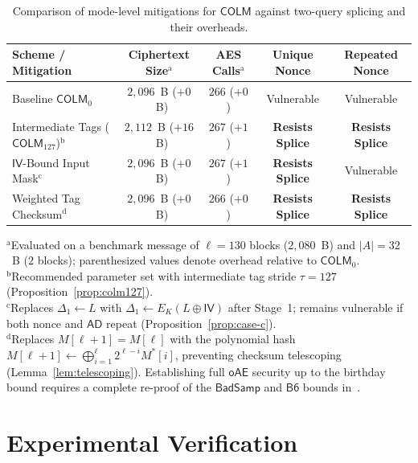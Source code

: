 \documentclass[11pt,a4paper]{article}
\theoremstyle{definition}
\theoremstyle{remark}
\newcommand{\COLM}{\mathsf{COLM}}
\newcommand{\COLMzero}{\mathsf{COLM}_0}
\newcommand{\COLMott}{\mathsf{COLM}_{127}}
\newcommand{\IV}{\mathsf{IV}}
\newcommand{\AD}{\mathsf{AD}}
\begin{document}
\begin{table}[t]
\centering
\caption{Comparison of mode-level mitigations for $\COLM$ against two-query splicing and their overheads.}
\label{tab:mitigations}
\small
\setlength{\tabcolsep}{0pt}
\begin{tabular*}{\textwidth}{@{\extracolsep{\fill}}lcccc@{}}
\toprule
\textbf{Scheme / Mitigation} & \textbf{Ciphertext Size}$^{\mathrm{a}}$ & \textbf{AES Calls}$^{\mathrm{a}}$ & \textbf{Unique Nonce} & \textbf{Repeated Nonce} \\
\midrule
Baseline $\COLMzero$ & $2{,}096$~B ($+0$~B) & $266$ ($+0$) & Vulnerable & Vulnerable \\
Intermediate Tags ($\COLMott$)$^{\mathrm{b}}$ & $2{,}112$~B ($+16$~B) & $267$ ($+1$) & \textbf{Resists Splice} & \textbf{Resists Splice} \\
$\IV$-Bound Input Mask$^{\mathrm{c}}$ & $2{,}096$~B ($+0$~B) & $267$ ($+1$) & \textbf{Resists Splice} & Vulnerable \\
Weighted Tag Checksum$^{\mathrm{d}}$ & $2{,}096$~B ($+0$~B) & $266$ ($+0$) & \textbf{Resists Splice} & \textbf{Resists Splice} \\
\bottomrule
\end{tabular*}
\vspace{3pt}
\parbox{\textwidth}{\footnotesize
$^{\mathrm{a}}$Evaluated on a benchmark message of $\ell = 130$ blocks ($2{,}080$~B) and $|A| = 32$~B ($2$ blocks); parenthesized values denote overhead relative to $\COLMzero$.\\
$^{\mathrm{b}}$Recommended parameter set with intermediate tag stride $\tau = 127$ (Proposition~\ref{prop:colm127}).\\
$^{\mathrm{c}}$Replaces $\Delta_1 \leftarrow L$ with $\Delta_1 \leftarrow E_K(L \oplus \IV)$ after Stage~1; remains vulnerable if both nonce and $\AD$ repeat (Proposition~\ref{prop:case-c}).\\
$^{\mathrm{d}}$Replaces $M[\ell+1] = M[\ell]$ with the polynomial hash $M[\ell+1] \leftarrow \bigoplus_{i=1}^\ell 2^{\ell-i} M^*[i]$, preventing checksum telescoping (Lemma~\ref{lem:telescoping}). Establishing full $\mathsf{oAE}$ security up to the birthday bound requires a complete re-proof of the $\mathsf{BadSamp}$ and $\mathsf{B6}$ bounds in~\cite{COLM24}.}
\end{table}

\section{Experimental Verification}
\label{sec:experiments}
\end{document}
